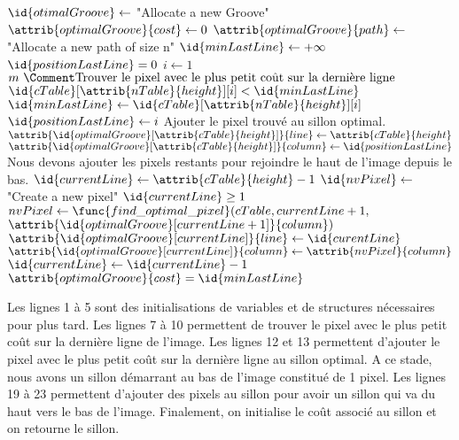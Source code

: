 \documentclass[a4paper, 11pt, oneside]{article}
\begin{document}
\begin{codebox} %
        \li $\id{otimalGroove} \gets$ "Allocate a new Groove"
        \li $\attrib{optimalGroove}{cost} \gets 0$
        \li $\attrib{optimalGroove}{path} \gets$ "Allocate a new path of size n"
        \li $\id{minLastLine} \gets +\infty$
        \li $\id{positionLastLine} = 0$
        \li
        \li \For $i \gets 1$ \To $m \text{ }\Comment \text{Trouver le pixel avec le plus petit coût sur la dernière ligne}$
                \Do
        \li     	\If $\id{cTable}[\attrib{nTable}{height}][i] < \id{minLastLine}$
        \li 			\Then
        					$\id{minLastLine} \gets \id{cTable}[\attrib{nTable}{height}][i]$
        	\li				$\id{positionLastLine} \gets i$
        				\End
                \End
        \li \Comment Ajouter le pixel trouvé au sillon optimal.
        \li $\attrib{\id{optimalGroove}[\attrib{cTable}{height}]}{line} \gets \attrib{cTable}{height}$
        \li $\attrib{\id{optimalGroove}[\attrib{cTable}{height}]}{column} \gets \id{positionLastLine}$
        \li
        \li \Comment Nous devons ajouter les pixels restants pour rejoindre le haut de l'image depuis le bas.
        \li $\id{currentLine} \gets \attrib{cTable}{height} - 1$
        \li $\id{nvPixel} \gets$ "Create a new pixel"
        \li
        \li \While $\id{currentLine} \geq 1$
        \li	\Do
        		$nvPixel \gets \func{find\_optimal\_pixel}(cTable, currentLine + 1,$ \\ \hspace{9cm} $\attrib{\id{optimalGroove}[currentLine + 1]}{column})$
        \li		$\attrib{\id{optimalGroove}[currentLine]}{line} \gets \id{curentLine}$
        \li		$\attrib{\id{optimalGroove}[currentLine]}{column} \gets \attrib{nvPixel}{column}$
        \li		$\id{currentLine} \gets \id{currentLine} - 1$
        \li	\End
        \li	$\attrib{optimalGroove}{cost} = \id{minLastLine}$
        \li \Return {}
\end{codebox}

Les lignes 1 à 5 sont des initialisations de variables et de structures nécessaires pour plus tard. Les lignes 7 à 10 permettent de trouver le pixel avec le plus petit coût sur la dernière ligne de l'image. Les lignes 12 et 13 permettent d'ajouter le pixel avec le plus petit coût sur la dernière ligne au sillon optimal. A ce stade, nous avons un sillon démarrant au bas de l'image constitué de 1 pixel. Les lignes 19 à 23 permettent d'ajouter des pixels au sillon pour avoir un sillon qui va du haut vers le bas de l'image. Finalement, on initialise le coût associé au sillon et on retourne le sillon.
\end{document}
